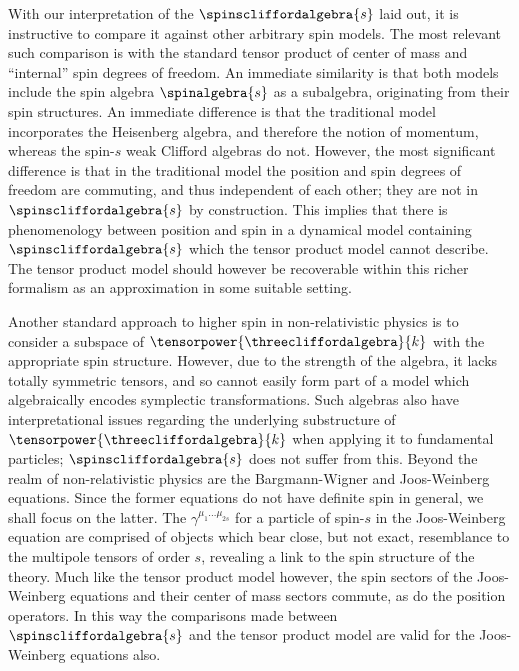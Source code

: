 \documentclass{article}
\begin{document}
With our interpretation of the $\spinscliffordalgebra{s}$ laid out, it is instructive to compare it against other arbitrary spin models. The most relevant such comparison is with the standard tensor product of center of mass and \enquote{internal} spin degrees of freedom\cite{weyl}. An immediate similarity is that both models include the spin algebra $\spinalgebra{s}$ as a subalgebra, originating from their spin structures. An immediate difference is that the traditional model incorporates the Heisenberg algebra\cite{schempp,wallach}, and therefore the notion of momentum, whereas the spin-$s$ weak Clifford algebras do not. However, the most significant difference is that in the traditional model the position and spin degrees of freedom are commuting, and thus independent of each other; they are not in $\spinscliffordalgebra{s}$ by construction. This implies that there is phenomenology between position and spin in a dynamical model containing $\spinscliffordalgebra{s}$ which the tensor product model cannot describe. The tensor product model should however be recoverable within this richer formalism as an approximation in some suitable setting.

Another standard approach to higher spin in non-relativistic physics is to consider a subspace of $\tensorpower{\threecliffordalgebra}{k}$ with the appropriate spin structure\cite{sommen}. However, due to the strength of the algebra, it lacks totally symmetric tensors, and so cannot easily form part of a model which algebraically encodes symplectic transformations. Such algebras also have interpretational issues regarding the underlying substructure of $\tensorpower{\threecliffordalgebra}{k}$ when applying it to fundamental particles; $\spinscliffordalgebra{s}$ does not suffer from this. Beyond the realm of non-relativistic physics are the Bargmann-Wigner\cite{bargmann} and Joos-Weinberg\cite{jefferey,weinberg-spin} equations. Since the former equations do not have definite spin in general\cite{jaroszewicz}, we shall focus on the latter. The $\gamma^{\mu_{1}\dots\mu_{2s}}$ for a particle of spin-$s$ in the Joos-Weinberg equation are comprised of objects which bear close, but not exact, resemblance to the multipole tensors of order $s$\cite{bradshaw}, revealing a link to the spin structure of the theory. Much like the tensor product model however, the spin sectors of the Joos-Weinberg equations and their center of mass sectors commute, as do the position operators. In this way the comparisons made between $\spinscliffordalgebra{s}$ and the tensor product model are valid for the Joos-Weinberg equations also.
\end{document}
